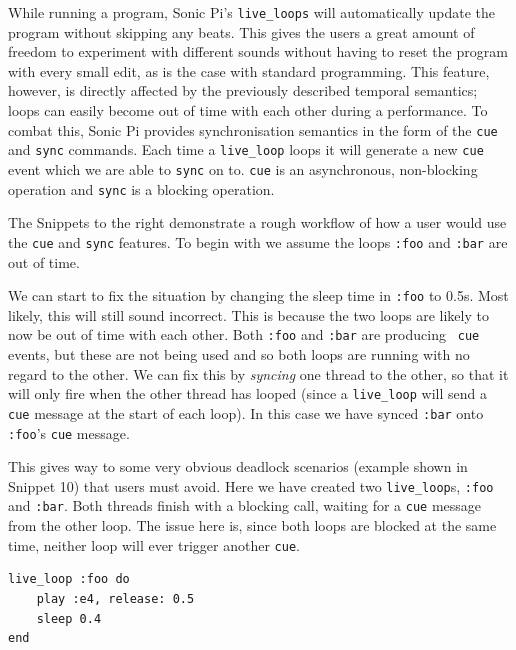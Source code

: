 \documentclass[11pt, abstracton, twoside, titlepage=true]{scrartcl}
\begin{document}
While running a program, Sonic Pi's \texttt{live\_loops} will automatically update 
the program without skipping any beats. This gives the users a great amount of 
freedom to experiment with different sounds without having to reset the program
with every small edit, as is the case with standard 
programming. This feature, however, is directly affected by the previously 
described temporal semantics; loops can easily become out of time with 
each other during a performance. To combat this, Sonic Pi provides 
synchronisation semantics in the form of the \texttt{cue} and \texttt{sync} 
commands. Each time a \texttt{live\_loop} loops it will generate a new \texttt{cue} 
event which we are able to \texttt{sync} on to. \texttt{cue} is an asynchronous,
non-blocking operation and \texttt{sync} is a blocking operation.

\begin{multicols}{2}
The Snippets to the right demonstrate a rough workflow of how a user would use 
the \texttt{cue} and \texttt{sync} features. To begin with we assume the loops 
\texttt{:foo} and \texttt{:bar} are out of time.

We can start to fix the situation by 
changing the sleep time in \texttt{:foo} to 0.5s. Most likely, this will still 
sound incorrect. This is because the two loops are likely to now be out of 
time with each other. Both \texttt{:foo} and \texttt{:bar} are producing \texttt{
cue} events, but these are not being used and so both loops are running with 
no regard to the other. We can fix this by \emph{syncing} one thread to the 
other, so that it will only fire when the other thread has looped (since
a \texttt{live\_loop} will send a \texttt{cue} message at the start of each loop).
In this case we have synced \texttt{:bar} onto \texttt{:foo}'s \texttt{cue} 
message.

This gives way to some very obvious deadlock scenarios (example shown in Snippet 10) 
that users must avoid. Here we have created two \texttt{live\_loop}s, \texttt{:foo}
and \texttt{:bar}. Both threads finish with a blocking call, waiting for a
\texttt{cue} message from the other loop. The issue here is, since both loops 
are blocked at the same time, neither loop will ever trigger another \texttt{cue}. 

	\begin{minipage}{0.5\textwidth}

		\begin{minipage}{\textwidth}
			\begin{lstlisting}[style = sonicpi]
live_loop :foo do
    play :e4, release: 0.5
    sleep 0.4
end


\end{lstlisting}
\end{minipage}
\end{minipage}
\end{multicols}
\end{document}
